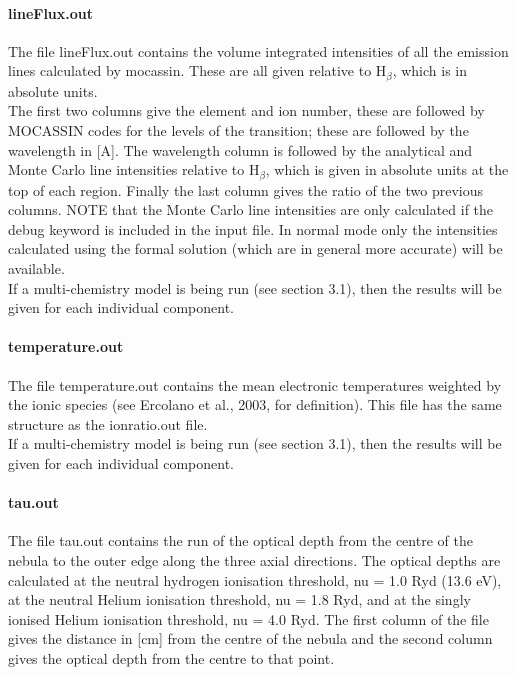 \documentclass[11pt]{article}
\begin{document}
\paragraph{    lineFlux.out}
    The file lineFlux.out contains the volume integrated intensities of all the 
    emission lines calculated by {\sc mocassin}. These are all given relative to H$_{\beta}$, 
    which is in absolute units. \\
    The first two columns give the element and ion number, these are 
    followed by MOCASSIN codes for the levels of the transition; these are followed 
    by the wavelength in [A]. The wavelength column is followed by the analytical 
    and Monte Carlo line intensities relative to H$_{\beta}$, which is given in absolute
    units at the top of each region. Finally the last column gives the ratio of 
    the two previous columns. NOTE that the Monte Carlo line intensities are only 
    calculated if the debug keyword is included in the input file. In normal mode
    only the intensities calculated using the formal solution (which are in general
    more accurate) will be available.\\
    If a multi-chemistry model is being run (see section 3.1), then the results 
    will be given for each individual component. \\

    
\paragraph{    temperature.out }
    The file temperature.out contains the mean electronic temperatures weighted by 
    the ionic species (see Ercolano et al., 2003, for definition). This file has the
    same structure as the ionratio.out file. \\
    If a multi-chemistry model is being run (see section 3.1), then the results 
    will be given for each individual component.\\ 

    
\paragraph{    tau.out}
    The file tau.out contains the run of the optical depth from the centre of the 
    nebula to the outer edge along the three axial directions. The optical depths 
    are calculated at the neutral hydrogen ionisation threshold, nu = 1.0 Ryd 
    (13.6 eV), at the neutral Helium ionisation threshold, nu = 1.8 Ryd, and at 
    the singly ionised Helium ionisation threshold, nu = 4.0 Ryd. The first column 
    of the file gives the distance in [cm] from the centre of the nebula and the 
    second column gives the optical depth from the centre to that point. \\
\end{document}
